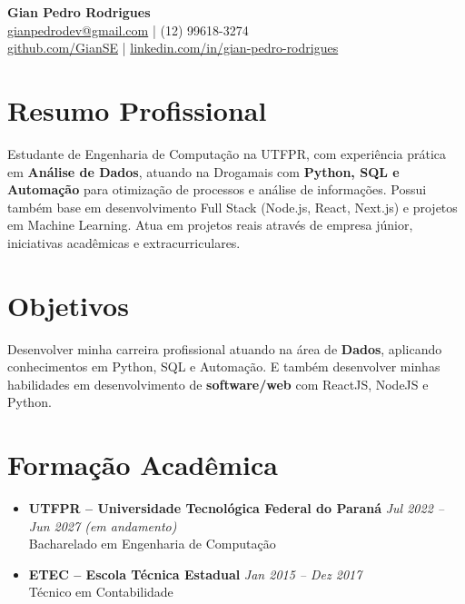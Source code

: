 \documentclass[a4paper,10pt]{article}
\begin{document}
\vspace*{-1cm}
\begin{center}
    {\LARGE \textbf{Gian Pedro Rodrigues}}\\
    \vspace{0.2cm}
    \href{mailto:gianpedrodev@gmail.com}{gianpedrodev@gmail.com} \quad | \quad (12) 99618-3274\\
    \href{https://github.com/GianSE}{github.com/GianSE} \quad | \quad
    \href{https://www.linkedin.com/in/gian-pedro-rodrigues-3b6a44259/}{linkedin.com/in/gian-pedro-rodrigues}
\end{center}

\vspace{0.4cm}

\section*{Resumo Profissional}
Estudante de Engenharia de Computação na UTFPR, com experiência prática em \textbf{Análise de Dados}, atuando na Drogamais com \textbf{Python, SQL e Automação} para otimização de processos e análise de informações. Possui também base em desenvolvimento Full Stack (Node.js, React, Next.js) e projetos em Machine Learning. Atua em projetos reais através de empresa júnior, iniciativas acadêmicas e extracurriculares.

\section*{Objetivos}
Desenvolver minha carreira profissional atuando na área de \textbf{Dados}, aplicando conhecimentos em Python, SQL e Automação. E também desenvolver minhas habilidades em desenvolvimento de \textbf{software/web} com ReactJS, NodeJS e Python.

\section*{Formação Acadêmica}
\begin{itemize}[leftmargin=*]
    \item \textbf{UTFPR – Universidade Tecnológica Federal do Paraná} \hfill \textit{Jul 2022 – Jun 2027 (em andamento)}\\
    Bacharelado em Engenharia de Computação

    \item \textbf{ETEC – Escola Técnica Estadual} \hfill \textit{Jan 2015 – Dez 2017}\\
    Técnico em Contabilidade
\end{itemize}
\end{document}
